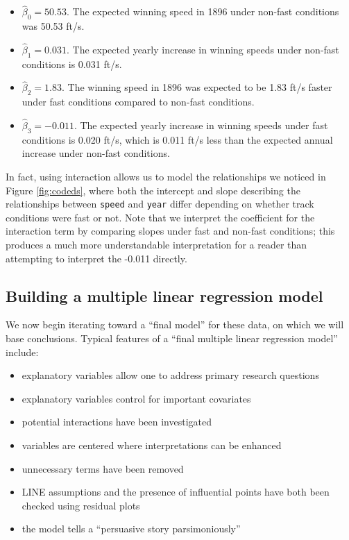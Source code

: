 \documentclass[
]{krantz}
\providecommand{\tightlist}{%
  \setlength{\itemsep}{0pt}\setlength{\parskip}{0pt}}
\begin{document}
\begin{itemize}
\tightlist
\item
  \(\hat{\beta}_{0} = 50.53\). The expected winning speed in 1896 under non-fast conditions was 50.53 ft/s.
\item
  \(\hat{\beta}_{1} = 0.031\). The expected yearly increase in winning speeds under non-fast conditions is 0.031 ft/s.
\item
  \(\hat{\beta}_{2} = 1.83\). The winning speed in 1896 was expected to be 1.83 ft/s faster under fast conditions compared to non-fast conditions.
\item
  \(\hat{\beta}_{3} = -0.011\). The expected yearly increase in winning speeds under fast conditions is 0.020 ft/s, which is 0.011 ft/s less than the expected annual increase under non-fast conditions.
\end{itemize}

In fact, using interaction allows us to model the relationships we noticed in Figure \ref{fig:codeds}, where both the intercept and slope describing the relationships between \texttt{speed} and \texttt{year} differ depending on whether track conditions were fast or not. Note that we interpret the coefficient for the interaction term by comparing slopes under fast and non-fast conditions; this produces a much more understandable interpretation for a reader than attempting to interpret the -0.011 directly.

\hypertarget{multreg_build}{%
\subsection{Building a multiple linear regression model}\label{multreg_build}}

We now begin iterating toward a ``final model'' for these data, on which we will base conclusions. Typical features of a ``final multiple linear regression model'' include:

\begin{itemize}
\tightlist
\item
  explanatory variables allow one to address primary research questions
\item
  explanatory variables control for important covariates
\item
  potential interactions have been investigated
\item
  variables are centered where interpretations can be enhanced
\item
  unnecessary terms have been removed
\item
  LINE assumptions and the presence of influential points have both been checked using residual plots
\item
  the model tells a ``persuasive story parsimoniously''
\end{itemize}
\end{document}
